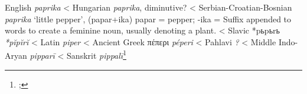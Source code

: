 \begin{etymology}\label{ety:paprika}
English \textit{paprika}
< Hungarian \textit{paprika}, diminutive?
< Serbian-Croatian-Bosnian \textit{paprika} `little pepper', (papar+ika) papar = pepper; -ika = Suffix appended to words to create a feminine noun, usually denoting a plant.
< Slavic {*pьpьrь} \textit{*pĭpĭrĭ }
< Latin \textit{piper}
< Ancient Greek {πέπερι} \textit{péperi}
< Pahlavi \textit{?}
< Middle Indo-Aryan \textit{pipparī}
< Sanskrit \textit{pippalī}\footnote{; }
\end{etymology}